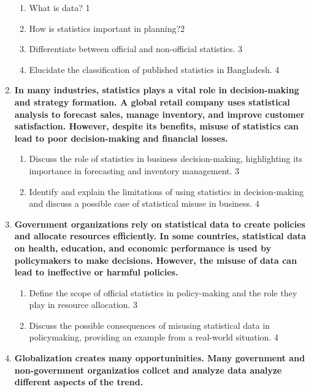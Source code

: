 \documentclass[a4paper,oneside]{book}
\begin{document}
\begin{enumerate}
  \begin{enumerate}
    \item
	What is data? \hfill 1
    \item
	How is statistics important in planning?\hfill 2
    \item  
	Differentiate between official and non-official statistics. \hfill 3
    \item
	Elucidate the classification of published statistics in Bangladesh.  \hfill 4
  \end{enumerate}
  
  \item
\textbf{In many industries, statistics plays a vital role in decision-making 
and strategy formation. A global retail company uses statistical analysis to 
forecast sales, manage inventory, and improve customer satisfaction. 
However, despite its benefits, misuse of statistics can lead to poor 
decision-making and financial losses.}

\begin{enumerate}
    \item  
    Discuss the role of statistics in business decision-making, highlighting 
    its importance in forecasting and inventory management. \hfill 3
    \item
    Identify and explain the limitations of using statistics in 
    decision-making and discuss a possible case of statistical misuse 
    in business. \hfill 4
\end{enumerate}

\item
\textbf{Government organizations rely on statistical data to create policies 
and allocate resources efficiently. In some countries, statistical data on 
health, education, and economic performance is used by policymakers to make 
decisions. However, the misuse of data can lead to ineffective or 
harmful policies.}

\begin{enumerate}
    \item  
    Define the scope of official statistics in policy-making and the role 
    they play in resource allocation. \hfill 3
    \item
    Discuss the possible consequences of misusing statistical data in 
    policymaking, providing an example from a real-world situation. \hfill 4
\end{enumerate}


   \item
	  \textbf{Globalization creates many opportuninities. Many government and non-government organizatios collcet and analyze data analyze different aspects of the trend.} 
  

\end{enumerate}
\end{document}
